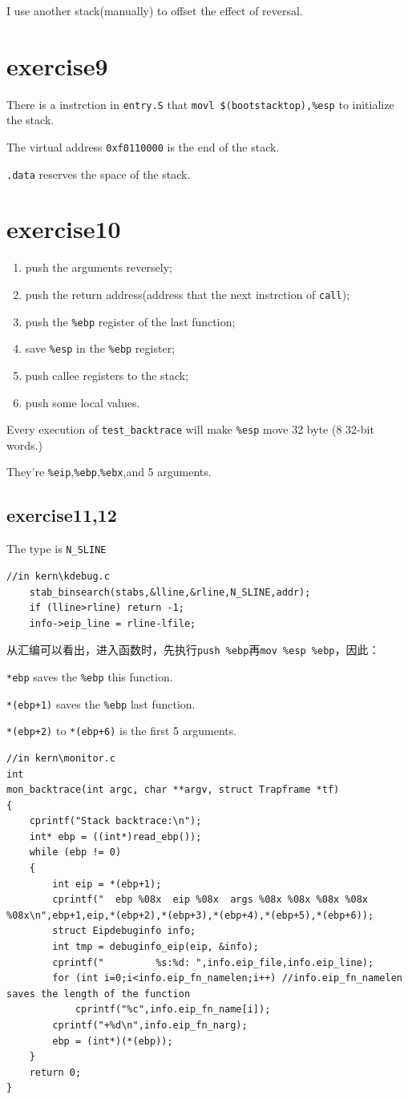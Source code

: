 \documentclass[UTF8,11pt]{ctexart}
\begin{document}
I use another stack(manually) to offset the effect of reversal.
\section*{exercise9}
There is a instrction in \verb|entry.S| that \verb|movl	$(bootstacktop),%esp| to initialize the stack.

The virtual address \verb|0xf0110000| is the end of the stack.

\verb|.data| reserves the space of the stack.
\section*{exercise10}

\begin{enumerate}
    \item push the arguments reversely;
    \item push the return address(address that the next instrction of \verb|call|);
    \item push the \verb|%ebp| register of the last function;
    \item save \verb|%esp| in the \verb|%ebp| register;
    \item push callee registers to the stack;
    \item push some local values.
\end{enumerate}

Every execution of \verb|test_backtrace| will make \verb|%esp| move 32 byte (8 32-bit words.)

They're \verb|%eip|,\verb|%ebp|,\verb|%ebx|,and 5 arguments.
\subsection*{exercise11,12}
The type is \verb|N_SLINE|

\begin{lstlisting}
//in kern\kdebug.c
	stab_binsearch(stabs,&lline,&rline,N_SLINE,addr);
	if (lline>rline) return -1;
	info->eip_line = rline-lfile;
\end{lstlisting}


从汇编可以看出，进入函数时，先执行\verb|push %ebp|再\verb|mov %esp %ebp|，因此：

\verb|*ebp| saves the \verb|%ebp| this function.

\verb|*(ebp+1)| saves the \verb|%ebp| last function.

\verb|*(ebp+2)| to \verb|*(ebp+6)| is the first 5 arguments.
\newpage
\begin{lstlisting}
//in kern\monitor.c
int
mon_backtrace(int argc, char **argv, struct Trapframe *tf)
{
	cprintf("Stack backtrace:\n");
	int* ebp = ((int*)read_ebp());
	while (ebp != 0)
	{
		int eip = *(ebp+1);
		cprintf("  ebp %08x  eip %08x  args %08x %08x %08x %08x %08x\n",ebp+1,eip,*(ebp+2),*(ebp+3),*(ebp+4),*(ebp+5),*(ebp+6));
		struct Eipdebuginfo info;
		int tmp = debuginfo_eip(eip, &info);
		cprintf("         %s:%d: ",info.eip_file,info.eip_line);
		for (int i=0;i<info.eip_fn_namelen;i++) //info.eip_fn_namelen saves the length of the function
			cprintf("%c",info.eip_fn_name[i]);
		cprintf("+%d\n",info.eip_fn_narg);
		ebp = (int*)(*(ebp));
	}
	return 0;
}
\end{lstlisting}
\end{document}
